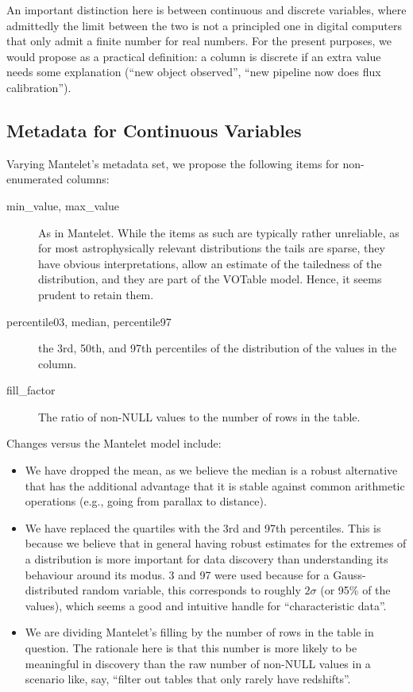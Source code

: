 \documentclass[11pt,a4paper]{ivoa}
\begin{document}
An important distinction here is between continuous and discrete
variables, where admittedly the limit between the two is not a 
principled one in digital computers that only admit a finite number
for real numbers.  For the present purposes, we would propose as a
practical definition: a column is discrete if an extra value
needs some explanation (``new object observed'', ``new pipeline now does
flux calibration'').


\subsection{Metadata for Continuous Variables}

Varying Mantelet's metadata set, we propose the following items for
non-enumerated columns:

\begin{description}
\item[min\_value, max\_value] As in Mantelet.  While the items as such are
typically rather unreliable, as for most astrophysically relevant
distributions the tails are sparse, they have obvious interpretations,
allow an estimate of the tailedness of the distribution, and they are
part of the VOTable model.  Hence, it seems prudent to retain them.
\item[percentile03, median, percentile97] the 3rd, 50th, and 97th
percentiles of the distribution of the values in the column.
\item[fill\_factor] The ratio of non-NULL values to the number of rows
in the table.
\end{description}

Changes versus the Mantelet model include:

\begin{itemize}
\item We have dropped the mean, as we believe the median is a robust
alternative that has the additional advantage that it is stable against
common arithmetic operations (e.g., going from parallax to distance).
\item We have replaced the quartiles with the 3rd and 97th percentiles.
This is because we believe that in general having robust estimates for
the extremes of a distribution is more important for data discovery than
understanding its behaviour around its modus.  3 and 97 were used
because for a Gauss-distributed random variable, this corresponds to
roughly $2\sigma$ (or 95\% of the values), which seems a good and
intuitive handle for ``characteristic data''.
\item We are dividing Mantelet's filling by the number of rows in the
table in question.  The rationale here is that this number is more
likely to be meaningful in discovery than the raw number of non-NULL
values in a scenario like, say, ``filter out tables that only rarely
have redshifts''.
\end{itemize}
\end{document}
